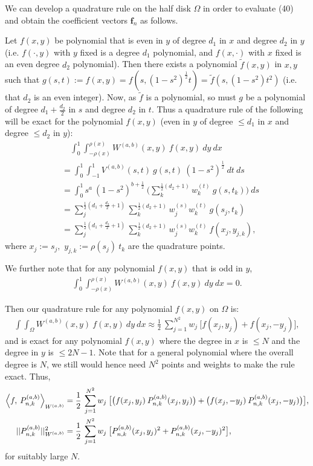 \documentclass[11pt, oneside]{article}   	%
\newcommand{\half}{\frac{1}{2}}
\newcommand{\Pnk}{P_{n,k}}
\begin{document}
We can develop a quadrature rule on the half disk \(\Omega\) in order to evaluate (40) and obtain the coefficient vectors \(\mathbf{f}_n\) as follows.




Let \(f(x,y)\) be polynomial that is even in \(y\) of degree $d_1$ in $x$ and degree $d_2$ in $y$ (i.e. $f(\cdot, y)$ with $y$ fixed is a degree $d_1$ polynomial, and $f(x, \cdot)$ with $x$ fixed is an even degree $d_2$ polynomial). Then there exists a polynomial \(\tilde{f}(x,y)\) in \(x,y\) such that \(g(s,t) := f(x, y) = f(s, (1-s^2)^\half t) = \tilde{f}(s, (1-s^2) t^2)\) (i.e. that $d_2$ is an even integer). Now, as \(\tilde{f}\) is a polynomial, so must \(g\) be a polynomial of degree $d_1+\frac{d_2}{2}$ in $s$ and degree $d_2$ in $t$. Thus a quadrature rule of the following will be exact for the polynomial $f(x,y)$ (even in \(y\) of degree $\le d_1$ in $x$ and degree $\le d_2$ in $y$):
\begin{align}
& \quad \int_0^1 \int_{-\rho(x)}^{\rho(x)} W^{(a,b)}(x,y) \: f(x,y) \: dy \: dx \\
&= \int_0^1 \int_{-1}^1 V^{(a,b)}(s,t) \: g(s,t) \: (1-s^2)^\half \: dt \: ds \\
&= \int_0^1 s^a \: (1-s^2)^{b+\half} \: \Big( \sum_k^{\half(d_2 + 1)} w_k^{(t)} \: g(s, t_k) \Big) \: ds \\
&= \sum_j^{\half(d_1 + \frac{d_2}{2} + 1)} \sum_k^{\half(d_2 + 1)} w_j^{(s)} w_k^{(t)} \: g(s_j, t_k) \\
&= \sum_j^{\half(d_1 + \frac{d_2}{2} + 1)} \sum_k^{\half(d_2 + 1)} w_j^{(s)} w_k^{(t)} \: f(x_j, y_{j,k}),
\end{align}
where \(x_j := s_j,\) \(y_{j,k} := \rho(s_j) \: t_k\) are the quadrature points.

We further note that for any polynomial \(f(x,y)\) that is odd in \(y\),
\begin{align}
\int_0^1 \int_{-\rho(x)}^{\rho(x)} W^{(a,b)}(x,y) \: f(x,y) \: dy \: dx = 0.
\end{align}


Then our quadrature rule for any polynomial \(f(x,y)\) on \(\Omega\) is:
\begin{align}
\int \int_\Omega W^{(a,b)}(x,y) \: f(x,y) \: dy \: dx \approx \half \: \sum_{j=1}^{N^2} w_j \: \big[ f(x_j, y_j) + f(x_j, -y_j) \big],
\end{align}
and is exact for any polynomial $f(x,y)$ where the degree in $x$ is $\le N$ and the degree in $y$ is $\le 2N-1$. Note that for a general polynomial where the overall degree is $N$, we still would hence need $N^2$ points and weights to make the rule exact. Thus,
\begin{align}
\ip< f, \: \Pnk^{(a,b)} >_{W^{(a,b)}} &= \half \: \sum_{j=1}^{N^2} w_j \: \big[ \big(f(x_j, y_j) \: \Pnk^{(a,b)}(x_j, y_j)\big) +\big(f(x_j, -y_j) \: \Pnk^{(a,b)}(x_j, -y_j)\big) \big], \\
|| \Pnk^{(a,b)} ||_{W^{(a,b)}}^2 &= \half \: \sum_{j=1}^{N^2} w_j \: \big[ \Pnk^{(a,b)}(x_j, y_j)^2 + \Pnk^{(a,b)}(x_j, -y_j)^2 \big],
\end{align}
for suitably large $N$.
\end{document}
